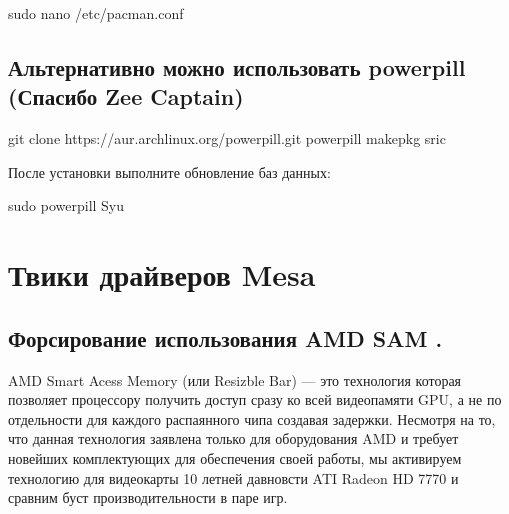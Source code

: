 \documentclass[letterpaper,10pt,russian,openany]{sphinxmanual}
\begin{document}
\begin{sphinxVerbatim}[commandchars=\\\{\}]
sudo nano /etc/pacman.conf 

  
\end{sphinxVerbatim}

\ignorespaces 

\subsection{Альтернативно можно использовать powerpill (Спасибо Zee Captain)}
\label{\detokenize{source/generic-system-acceleration:powerpill-zee-captain}}\label{\detokenize{source/generic-system-acceleration:powerpill}}\label{\detokenize{source/generic-system-acceleration:index-11}}
\begin{sphinxVerbatim}[commandchars=\\\{\}]
git clone https://aur.archlinux.org/powerpill.git
 powerpill
makepkg \PYGZhy{}sric
\end{sphinxVerbatim}

\sphinxAtStartPar
После установки выполните обновление баз данных:

\begin{sphinxVerbatim}[commandchars=\\\{\}]
sudo powerpill \PYGZhy{}Syu
\end{sphinxVerbatim}


\section{Твики драйверов Mesa}
\label{\detokenize{source/generic-system-acceleration:id7}}
\ignorespaces 

\subsection{Форсирование использования AMD SAM .}
\label{\detokenize{source/generic-system-acceleration:amd-sam}}\label{\detokenize{source/generic-system-acceleration:force-amd-sam}}\label{\detokenize{source/generic-system-acceleration:index-12}}
\sphinxAtStartPar
AMD Smart Acess Memory (или Resizble Bar) — это технология которая позволяет процессору получить доступ сразу ко всей видеопамяти GPU,
а не по отдельности для каждого распаянного чипа создавая задержки. Несмотря на то,
что данная технология заявлена только для оборудования AMD и требует новейших комплектующих для обеспечения своей работы,
мы активируем технологию для видеокарты 10 летней давновсти ATI Radeon HD 7770 и сравним буст производительности в паре игр.
\end{document}
